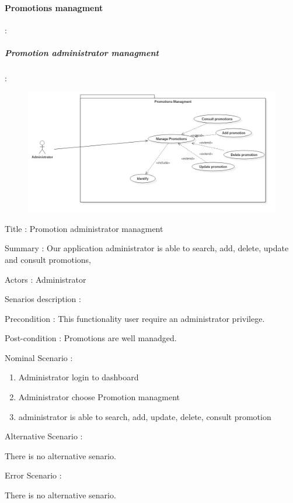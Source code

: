 \paragraph{Promotions managment} :
\label{sec:sec01}   

\subparagraph{Promotion administrator managment} :
\label{sec:sec01} 

 \begin{figure}[H]
	\centering
	\includegraphics[height=0.3\textheight]{fig01/PromotionUseCaseDiagram}
	\label{fig:FilialesEtClients}
\end{figure}
\begin{flushleft}
Title : Promotion administrator managment

Summary : Our application administrator is able to search, add, delete, update and consult promotions,

Actors : Administrator 

Senarios description :

Precondition : This functionality user require an administrator privilege.

Post-condition : Promotions are well manadged.

Nominal Scenario :

 \begin{enumerate}
   \item Administrator login to dashboard
   \item Administrator choose Promotion managment
   \item administrator is able to search, add, update, delete, consult promotion
 \end{enumerate}

Alternative Scenario :

There is no alternative senario.

Error Scenario :

There is no alternative senario.

\end{flushleft}

